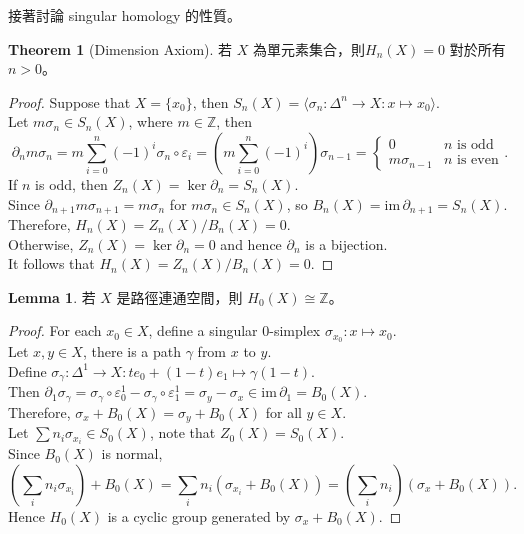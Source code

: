\documentclass[12pt]{article}
\theoremstyle{definition}
\newtheorem{theorem}[definition]{Theorem}
\newtheorem{lemma}[definition]{Lemma}
\newcommand\<{\langle}
\renewcommand\>{\rangle}
\newcommand\im{\mathrm{im}\hspace{2pt}}
\begin{document}
\begin{CJK}{UTF8}{bsmi}
接著討論 singular homology 的性質。

\begin{theorem}[Dimension Axiom]
    若 $X$ 為單元素集合，則$H_n(X)=0$ 對於所有 $n>0$。
\end{theorem}
\begin{proof}
    Suppose that $X=\{x_0\}$, then $S_n(X)=\<\sigma_n:\Delta^n\to X:x\mapsto x_0\>$. \\
    Let $m\sigma_n\in S_n(X)$, where $m\in\mathbb{Z}$, then
    \[
        \partial_n m\sigma_n 
        = m\sum_{i=0}^n(-1)^i\sigma_n\circ\varepsilon_i
        = \left(m\sum_{i=0}^n(-1)^i\right)\sigma_{n-1}
        = \begin{cases}
            0 & n \text{ is odd} \\
            m\sigma_{n-1} & n \text{ is even}
        \end{cases}.
    \]
    If $n$ is odd, then $Z_n(X)=\ker\partial_n=S_n(X)$. \\
    Since $\partial_{n+1}m\sigma_{n+1}=m\sigma_n$ for $m\sigma_n\in S_n(X)$, so $B_n(X)=\im\partial_{n+1}=S_n(X)$. \\
    Therefore, $H_n(X)=Z_n(X)/B_n(X)=0$. \\
    Otherwise, $Z_n(X)=\ker\partial_n=0$ and hence $\partial_n$ is a bijection. \\
    It follows that $H_n(X)=Z_n(X)/B_n(X)=0$.
\end{proof}

\begin{lemma}
    若 $X$ 是路徑連通空間，則 $H_0(X)\cong\mathbb{Z}$。
\end{lemma}
\begin{proof}
    For each $x_0\in X$, define a singular $0$-simplex $\sigma_{x_0}:x\mapsto x_0$. \\
    Let $x, y\in X$, there is a path $\gamma$ from $x$ to $y$. \\
    Define $\sigma_\gamma:\Delta^1\to X:te_0+(1-t)e_1\mapsto \gamma(1-t)$. \\
    Then $\partial_1\sigma_\gamma=\sigma_\gamma\circ\varepsilon_0^1-\sigma_\gamma\circ\varepsilon_1^1=\sigma_y-\sigma_x\in\im\partial_1=B_0(X)$. \\
    Therefore, $\sigma_x+B_0(X)=\sigma_y+B_0(X)$ for all $y\in X$. \\
    Let $\sum n_i\sigma_{x_i}\in S_0(X)$, note that $Z_0(X)=S_0(X)$. \\
    Since $B_0(X)$ is normal, 
    \[
        \left(\sum_i n_i\sigma_{x_i}\right)+B_0(X)
        = \sum_i n_i(\sigma_{x_i}+B_0(X))
        = \left(\sum_i n_i\right)(\sigma_x+B_0(X)).
    \]
    Hence $H_0(X)$ is a cyclic group generated by $\sigma_x+B_0(X)$.
\end{proof}


\end{CJK}
\end{document}
